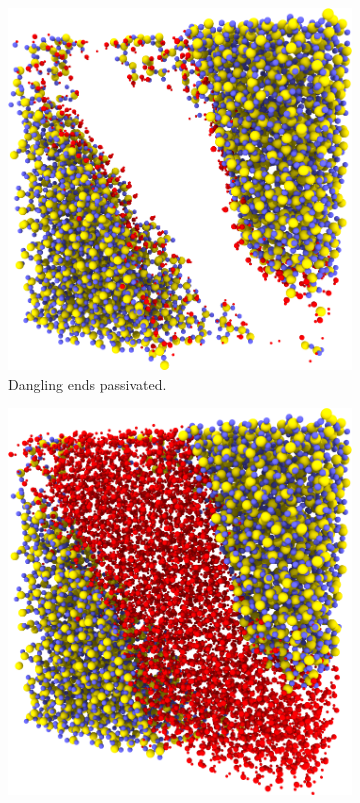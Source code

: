 \begin{figure}[htpb]
\begin{subfigure}[t]{\myfigwidth}
        \includegraphics[width=\textwidth]{images/experimental_procedure/04_10}%
        \caption{%
            Dangling ends passivated.%
            \label{fig:initialization_step04}%
        }%
        \hspace{8pt}
    \end{subfigure}%
    \hspace{\myhfillwidth}%
    \begin{subfigure}[t]{\myfigwidth}%
        \includegraphics[width=\textwidth]{images/experimental_procedure/05_10}%

\end{subfigure}
\end{figure}
